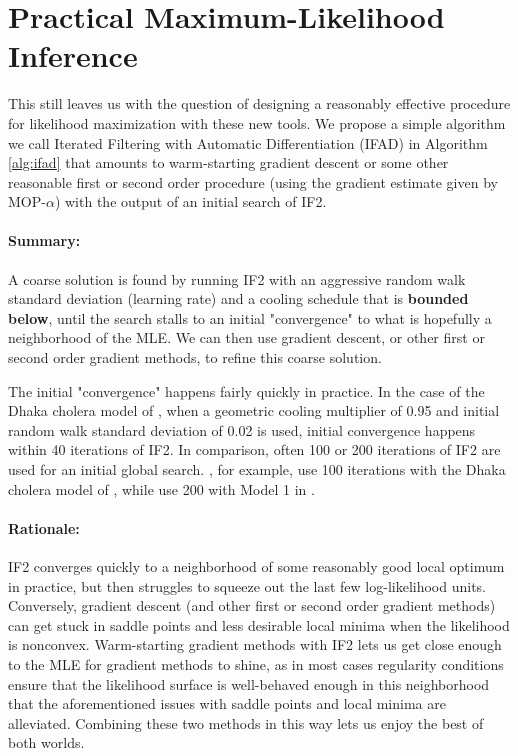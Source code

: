 \documentclass{article}
\begin{document}
\section{Practical Maximum-Likelihood Inference}


This still leaves us with the question of designing a reasonably effective procedure for likelihood maximization with these new tools. We propose a simple algorithm we call Iterated Filtering with Automatic Differentiation (IFAD) in Algorithm \ref{alg:ifad} that amounts to warm-starting gradient descent or some other reasonable first or second order procedure (using the gradient estimate given by MOP-$\alpha$) with the output of an initial search of IF2. 

\paragraph{Summary:} A coarse solution is found by running IF2 with an aggressive random walk standard deviation (learning rate) and a cooling schedule that is \textbf{bounded below}, until the search stalls to an initial "convergence" to what is hopefully a neighborhood of the MLE. We can then use gradient descent, or other first or second order gradient methods, to refine this coarse solution.

The initial "convergence" happens fairly quickly in practice. In the case of the Dhaka cholera model of \cite{king08}, when a geometric cooling multiplier of 0.95 and initial random walk standard deviation of 0.02 is used, initial convergence happens within 40 iterations of IF2. In comparison, often 100 or 200 iterations of IF2 are used for an initial global search. \cite{ionides15}, for example, use 100 iterations with the Dhaka cholera model of \cite{king08}, while \cite{wheeler23} use 200 with Model 1 in \cite{Lee_haiticholera}. 

\paragraph{Rationale:}

IF2 converges quickly to a neighborhood of some reasonably good local optimum in practice, but then struggles to squeeze out the last few log-likelihood units. Conversely, gradient descent (and other first or second order gradient methods) can get stuck in saddle points and less desirable local minima when the likelihood is nonconvex. Warm-starting gradient methods with IF2 lets us get close enough to the MLE for gradient methods to shine, as in most cases regularity conditions ensure that the likelihood surface is well-behaved enough in this neighborhood that the aforementioned issues with saddle points and local minima are alleviated. Combining these two methods in this way lets us enjoy the best of both worlds.
\end{document}
